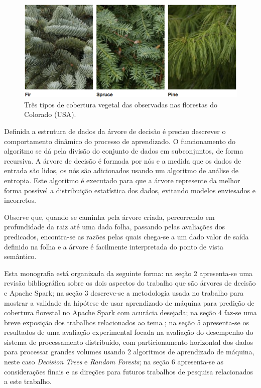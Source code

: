 \documentclass[12pt]{article}
\begin{document}
\begin{figure}[!ht]
	\centering
	\begin{minipage}[t]{0.55\textwidth}
        \includegraphics[width=\textwidth]{img/vegetacao.png}
        \centering
	\end{minipage}
	\caption
	{
	    Três tipos de cobertura vegetal das observadas nas florestas do Colorado (USA).
	}
	\label{fig:vegetacao}
\end{figure}

Definida a estrutura de dados da árvore de decisão é preciso descrever o comportamento dinâmico do processo de aprendizado. O funcionamento do algoritmo se dá pela divisão do conjunto de dados em subconjuntos, de forma recursiva. A árvore de decisão é formada por nós e a medida que os dados de entrada são lidos, os nós são adicionados usando um algoritmo de análise de entropia. Este algoritmo é executado para que a árvore represente da melhor forma possível a distribuição estatística dos dados, evitando modelos enviesados e incorretos.  

Observe que, quando se caminha pela árvore criada, percorrendo em profundidade da raiz até uma dada folha, passando pelas avaliações dos predicados, encontra-se as razões pelas quais chega-se a um dado valor de saída definido na folha e a árvore é facilmente interpretada do ponto de vista semântico.

Esta monografia está organizada da seguinte forma: na seção 2 apresenta-se uma revisão bibliográfica sobre os dois aspectos do trabalho que são árvores de decisão e Apache Spark; na seção 3 descreve-se a metodologia usada no trabalho para mostrar a validade da hipótese de usar aprendizado de máquina para predição de cobertura florestal no Apache Spark com acurácia desejada; na seção 4 faz-se uma breve exposição dos trabalhos relacionados ao tema ; na seção 5 apresenta-se os resultados de uma avaliação experimental focada na avaliação do desempenho do sistema de processamento distribuído, com particionamento horizontal dos dados para processar grandes volumes usando 2 algoritmos de aprendizado de máquina, neste caso {\it Decision Trees} e {\it Random Forests}; na seção 6 apresenta-se as considerações finais e as direções para futuros trabalhos de pesquisa relacionados a este trabalho.
\end{document}
